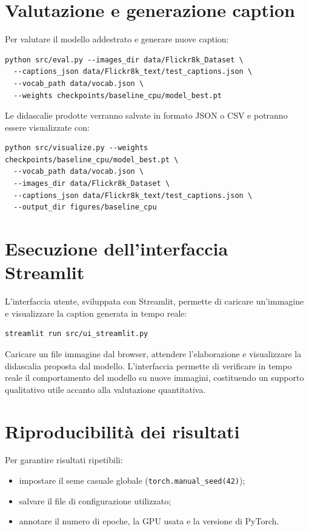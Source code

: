 \documentclass[11pt,a4paper]{report}
\begin{document}
\section{Valutazione e generazione caption}

Per valutare il modello addestrato e generare nuove caption:

\begin{verbatim}
python src/eval.py --images_dir data/Flickr8k_Dataset \
  --captions_json data/Flickr8k_text/test_captions.json \
  --vocab_path data/vocab.json \
  --weights checkpoints/baseline_cpu/model_best.pt
\end{verbatim}

Le didascalie prodotte verranno salvate in formato JSON o CSV e potranno essere visualizzate con:
\begin{verbatim}
python src/visualize.py --weights checkpoints/baseline_cpu/model_best.pt \
  --vocab_path data/vocab.json \
  --images_dir data/Flickr8k_Dataset \
  --captions_json data/Flickr8k_text/test_captions.json \
  --output_dir figures/baseline_cpu
\end{verbatim}

\section{Esecuzione dell’interfaccia Streamlit}

L’interfaccia utente, sviluppata con Streamlit, permette di caricare un’immagine e visualizzare la caption generata in tempo reale:

\begin{verbatim}
streamlit run src/ui_streamlit.py
\end{verbatim}

\begin{tcolorbox}[title=Esempio d’uso]
Caricare un file immagine dal browser, attendere l’elaborazione e visualizzare la didascalia proposta dal modello.  
L’interfaccia permette di verificare in tempo reale il comportamento del modello su nuove immagini, costituendo un supporto qualitativo utile accanto alla valutazione quantitativa.
\end{tcolorbox}

\section{Riproducibilità dei risultati}

Per garantire risultati ripetibili:
\begin{itemize}
  \item impostare il seme casuale globale (\texttt{torch.manual\_seed(42)});
  \item salvare il file di configurazione utilizzato;
  \item annotare il numero di epoche, la GPU usata e la versione di PyTorch.
\end{itemize}
\end{document}
